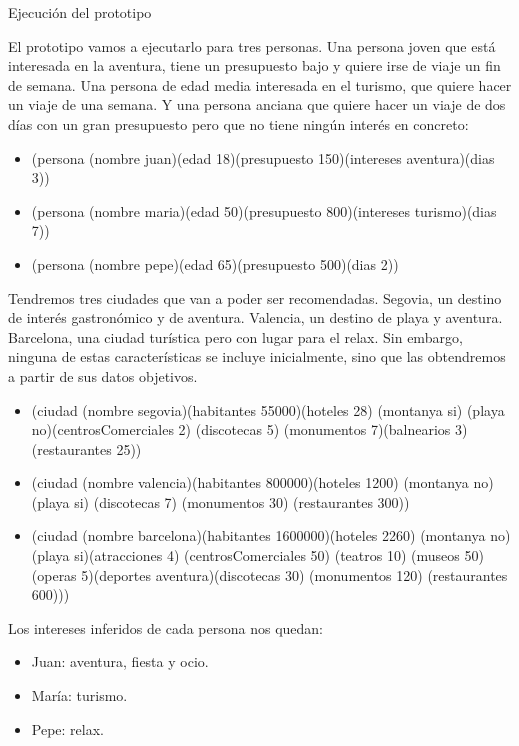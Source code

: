 \documentclass[11pt, a4paper, spanish, openright, twoside]{book}
\begin{document}
	\begin{section}{Ejecución del prototipo}
	
	El prototipo vamos a ejecutarlo para tres personas. Una persona joven que está interesada en la aventura, tiene un 
	presupuesto bajo y quiere irse de viaje un fin de semana. Una persona de edad media interesada en el turismo, que quiere 
	hacer un viaje de una semana. Y una persona anciana que quiere hacer un viaje de dos días con un gran presupuesto 
	pero que no tiene ningún interés en concreto:
		\begin{itemize}
			\item (persona (nombre juan)(edad 18)(presupuesto 150)(intereses aventura)(dias 3))
			\item  (persona (nombre maria)(edad 50)(presupuesto 800)(intereses turismo)(dias 7))
			\item  (persona (nombre pepe)(edad 65)(presupuesto 500)(dias 2))
	\end{itemize}
			
	Tendremos tres ciudades que van a poder ser recomendadas. Segovia, un destino de interés gastronómico y de aventura. 			Valencia, un destino de playa y aventura. Barcelona, una ciudad turística pero con lugar para el relax. Sin embargo, ninguna 			de estas características se incluye inicialmente, sino  que las obtendremos a partir de sus datos objetivos.
	
		\begin{itemize}
			\item     (ciudad (nombre segovia)(habitantes 55000)(hoteles 28)
        (montanya si) (playa no)(centrosComerciales 2)
        (discotecas 5) (monumentos 7)(balnearios 3)(restaurantes 25))
			\item (ciudad (nombre valencia)(habitantes 800000)(hoteles 1200)
        (montanya no) (playa si) (discotecas 7)  (monumentos 30)
        (restaurantes 300))
			\item  
	(ciudad (nombre barcelona)(habitantes 1600000)(hoteles 2260)
        (montanya no) (playa si)(atracciones 4) (centrosComerciales 50)
    (teatros 10) (museos 50) (operas 5)(deportes aventura)(discotecas 30) (monumentos 120) (restaurantes 600)))
	\end{itemize}
 
 
 	Los intereses inferidos de cada persona nos quedan:
 		\begin{itemize}
			\item Juan: aventura, fiesta y ocio.
			\item María: turismo.
			\item Pepe: relax.
	\end{itemize}
 	

\end{section}
\end{document}
